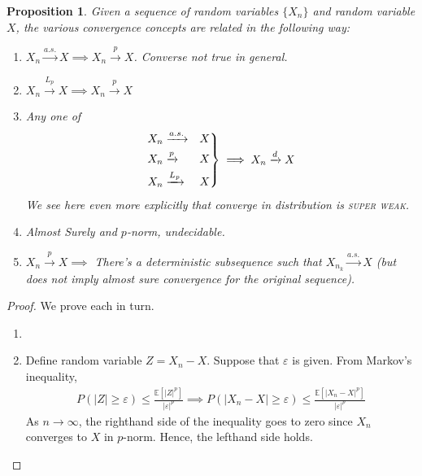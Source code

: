 \documentclass[12pt]{article}
\theoremstyle{plain}
\newtheorem{prop}[thm]{Proposition}
\theoremstyle{definition}
\theoremstyle{remark}
\newcommand{\ra}{\rightarrow}
\newcommand{\E}{\mathbb{E}}
\newenvironment{rcases}
  {\left.\begin{aligned}}
  {\end{aligned}\right\rbrace}
\newcommand{\asto}{\xrightarrow{a.s.}}
\newcommand{\pto}{\xrightarrow{p}}
\newcommand{\dto}{\xrightarrow{d}}
\newcommand{\Lpto}{\xrightarrow{L_p}}
\begin{document}
\begin{prop}
Given a sequence of random variables $\{X_n\}$ and random variable $X$,
the various convergence concepts are related in the following way:
\begin{enumerate}
  \item $X_n\asto X \implies X_n\pto X$. Converse not true in general.
  \item $X_n\Lpto X \implies X_n\pto X$
  \item Any one of
    \begin{align*}
      \begin{rcases}
        X_n&\asto &X \\
        X_n&\pto &X \\
        X_n&\Lpto &X
      \end{rcases}
      \implies X_n\dto X
    \end{align*}
    We see here even more explicitly that converge in distribution is
    \textsc{super weak}.
  \item Almost Surely and $p$-norm, undecidable.
  \item $X_n\pto X \implies$ There's a deterministic subsequence such
    that $X_{n_k}\asto X$ (but does not imply almost sure convergence
    for the original sequence).
\end{enumerate}
\end{prop}
\begin{proof}
We prove each in turn.
\begin{enumerate}
  \item

  \item Define random variable $Z=X_n-X$. Suppose that $\varepsilon$ is
    given. From Markov's inequality,
    \begin{align*}
      P(|Z| \geq \varepsilon) \leq \frac{\E[|Z|^p]}{|\varepsilon|^p}
      \implies
      P(|X_n-X| \geq \varepsilon) \leq \frac{\E[|X_n-X|^p]}{|\varepsilon|^p}
    \end{align*}
    As $n\ra\infty$, the righthand side of the inequality goes to zero
    since $X_n$ converges to $X$ in $p$-norm. Hence, the lefthand side
    holds.

\end{enumerate}
\end{proof}
\end{document}
